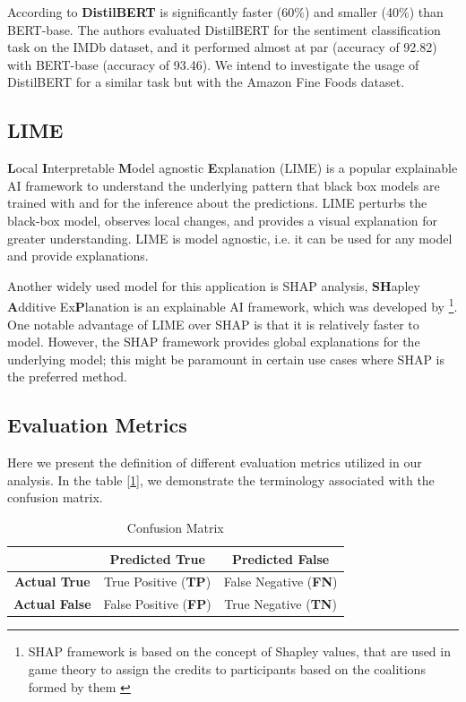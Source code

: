 \documentclass[11pt]{article}
\begin{document}
According to \cite{distilbert} \textbf{DistilBERT} is significantly faster (60\%) and smaller (40\%) than BERT-base. The authors evaluated DistilBERT for the sentiment classification task on the IMDb dataset, and it performed almost at par (accuracy of 92.82) with BERT-base (accuracy of 93.46). We intend to investigate the usage of DistilBERT for a similar task but with the Amazon Fine Foods dataset.
\subsection{LIME}
\textbf{L}ocal \textbf{I}nterpretable \textbf{M}odel agnostic \textbf{E}xplanation (LIME) \cite{LIME} is a popular explainable AI framework to understand the underlying pattern that black box models are trained with and for the inference about the predictions. LIME perturbs the black-box model, observes local changes, and provides a visual explanation for greater understanding. LIME is model agnostic, i.e. it can be used for any model and provide explanations.


Another widely used model for this application is SHAP analysis, \textbf{SH}apley \textbf{A}dditive Ex\textbf{P}lanation is an explainable AI framework, which was developed by \cite{shap}\footnote{ SHAP framework is based on the concept of Shapley values, that are used in game theory to assign the credits to participants based on the coalitions formed by them \cite{shapley}}. One notable advantage of LIME over SHAP is that it is relatively faster to model. However, the SHAP framework provides global explanations for the underlying model; this might be paramount in certain use cases where SHAP is the preferred method. 

\subsection{Evaluation Metrics}
Here we present the definition of different evaluation metrics utilized in our analysis. In the table [\ref{tab:confusion_mat}], we demonstrate the terminology associated with the confusion matrix.


\begin{table}
\small
    \centering
    \begin{tabular}{c| c c}
    \hline 
         & \textbf{Predicted True} & \textbf{Predicted False} \\ \hline 
    \textbf{Actual True}  & True Positive (\textbf{TP}) & False Negative (\textbf{FN})\\
    \textbf{Actual False}   & False Positive (\textbf{FP}) & True Negative (\textbf{TN})\\\hline 
         
    \end{tabular}
    \caption{Confusion Matrix}
    \label{tab:confusion_mat}
\end{table}
\end{document}
